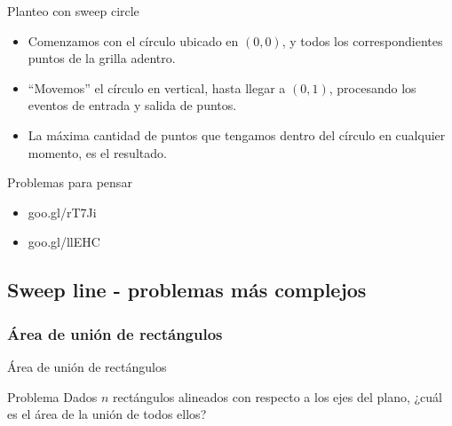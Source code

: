 \documentclass[compress]{beamer}
\begin{document}
\begin{frame}{Planteo con sweep circle}

\begin{itemize}
    \item Comenzamos con el círculo ubicado en $(0,0)$, y todos los correspondientes puntos de la grilla adentro.
    \item ``Movemos'' el círculo en vertical, hasta llegar a $(0,1)$, procesando los eventos de entrada y salida de puntos.
    \item La máxima cantidad de puntos que tengamos dentro del círculo en cualquier momento, es el resultado.
\end{itemize}

\pause


\end{frame}

\begin{frame}{Problemas para pensar}

\begin{itemize}
\item goo.gl/rT7Ji
\item goo.gl/llEHC
\end{itemize}

\end{frame}

\subsection{Sweep line - problemas más complejos}
\subsubsection{Área de unión de rectángulos}
\begin{frame}{Área de unión de rectángulos}

\begin{block}{Problema}
Dados $n$ rectángulos alineados con respecto a los ejes del plano, 
¿cuál es el área de la unión de todos ellos?
\end{block}


\end{frame}
\end{document}
